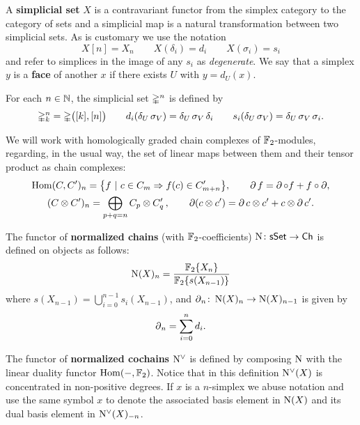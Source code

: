 A \textbf{simplicial set} $X$ is a contravariant functor from the simplex category to the category of sets and a simplicial map is a natural transformation between two simplicial sets.
As is customary we use the notation
\[
X [n] = X_n \qquad X(\delta_i) = d_i \qquad X(\sigma_i) = s_i
\]
and refer to simplices in the image of any $s_i$ as \textit{degenerate}.
We say that a simplex $y$ is a \textbf{face} of another $x$ if there exists $U$ with $y = d_U(x)$.


For each $n \in \mathbb{N}$, the simplicial set $\mathbb{\Delta}^n$ is defined by
\[
\mathbb{\Delta}^n_k = \mathbb{\Delta} \big( [k], [n] \big) \qquad
d_i(\delta_U\, \sigma_V) = \delta_U\, \sigma_V \, \delta_i \qquad
s_i(\delta_U\, \sigma_V) = \delta_U\, \sigma_V \, \sigma_i.
\]

We will work with homologically graded chain complexes of ${\mathbb{F}_2}$-modules, regarding, in the usual way, the set of linear maps between them and their tensor product as chain complexes:
\begin{gather*}
\mathrm{Hom}(C, C')_n = \big\{f \ |\ c\in C_m \Rightarrow f(c) \in C'_{m+n} \big\},
\qquad
\operatorname{\partial} f = \operatorname{\partial} \circ f + f \circ \operatorname{\partial}, \\
(C \otimes C^\prime)_n = \bigoplus_{p + q = n} C_p \otimes C^\prime_q \,,
\qquad
\operatorname{\partial} (c \otimes c^\prime) = \operatorname{\partial} c \otimes c^\prime + c \otimes \operatorname{\partial} c^\prime.
\end{gather*}

The functor of \textbf{normalized chains} (with ${\mathbb{F}_2}$-coefficients) $\operatorname{N} \colon \mathsf{sSet} \to \mathsf{Ch}$ is defined on objects as follows:
\[
\operatorname{N}(X)_n = \frac{{\mathbb{F}_2} \{ X_n \}}{{\mathbb{F}_2} \{ s(X_{n-1}) \}}
\]
where $s(X_{n-1}) = \bigcup_{i=0}^{n-1} s_i(X_{n-1})$, and $\operatorname{\partial}_n \colon \operatorname{N}(X)_n \to \operatorname{N}(X)_{n-1}$ is given by
\[
\operatorname{\partial}_n = \sum_{i = 0}^{n} d_{i}.
\]

The functor of \textbf{normalized cochains} $\operatorname{N^{\vee}}$ is defined by composing $\operatorname{N}$ with the linear duality functor $\mathrm{Hom}(-, {\mathbb{F}_2})$.
Notice that in this definition $\operatorname{N^{\vee}}(X)$ is concentrated in non-positive degrees.
If $x$ is a $n$-simplex we abuse notation and use the same symbol $x$ to denote the associated basis element in $\operatorname{N}(X)$ and its dual basis element in $\operatorname{N^{\vee}}(X)_{-n}$.